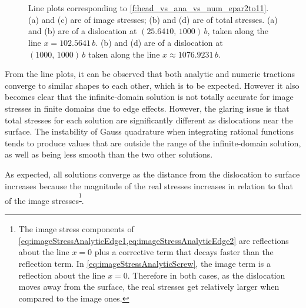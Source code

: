 \documentclass[11pt]{iopart}
\begin{document}
\begin{figure}
    \centering
    ~

    ~

    \caption{Line plots corresponding to \cref{f:head_vs_ana_vs_num_epar2to11}. (a) and (c) are of image stresses; (b) and (d) are of total stresses. (a) and (b) are of a dislocation at $(25.6410,\, 1000)\, b$, taken along the line $x = 102.5641\, b$. (b) and (d) are of a dislocation at $(1000,\, 1000)\, b$ taken along the line $x \approx 1076.9231\, b$.}
    \label{f:line_head_vs_ana_vs_num_epar2to11}
\end{figure}
From the line plots, it can be observed that both analytic and numeric tractions converge to similar shapes to each other, which is to be expected. However it also becomes clear that the infinite-domain solution is not totally accurate for image stresses in finite domains due to edge effects. However, the glaring issue is that total stresses for each solution are significantly different as dislocations near the surface. The instability of Gauss quadrature when integrating rational functions tends to produce values that are outside the range of the infinite-domain solution, as well as being less smooth than the two other solutions.

As expected, all solutions converge as the distance from the dislocation to surface increases because the magnitude of the real stresses increases in relation to that of the image stresses\textsuperscript{\footnote{The image stress components of \cref{eq:imageStressAnalyticEdge1,eq:imageStressAnalyticEdge2} are reflections about the line $x=0$ plus a corrective term that decays faster than the reflection term. In \cref{eq:imageStressAnalyticScrew}, the image term is a reflection about the line $x=0$. Therefore in both cases, as the dislocation moves away from the surface, the real stresses get relatively larger when compared to the image ones.}}.
\end{document}
